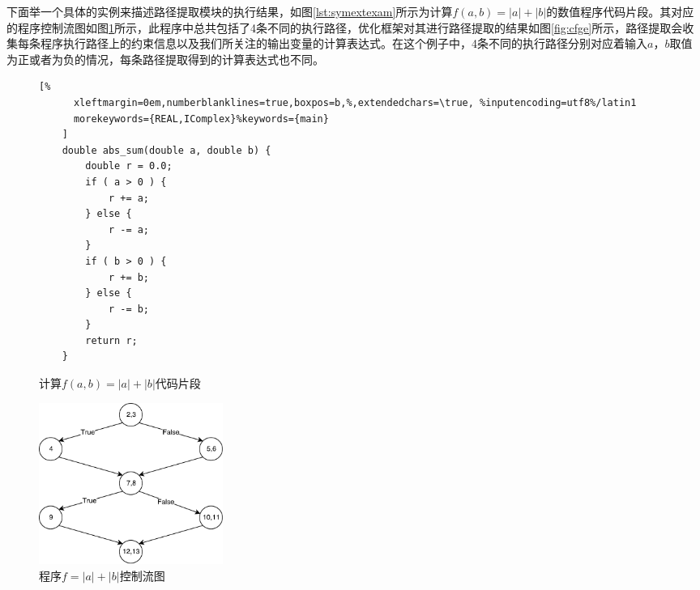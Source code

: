 下面举一个具体的实例来描述路径提取模块的执行结果，如图\ref{lst:symextexam}所示为计算$f(a,b)=|a|+|b|$的数值程序代码片段。其对应的程序控制流图如图\ref{fig:cfg}所示，此程序中总共包括了4条不同的执行路径，优化框架对其进行路径提取的结果如图\ref{fig:cfge}所示，路径提取会收集每条程序执行路径上的约束信息以及我们所关注的输出变量的计算表达式。在这个例子中，4条不同的执行路径分别对应着输入$a$，$b$取值为正或者为负的情况，每条路径提取得到的计算表达式也不同。

\begin{figure}[htbp]
  \centering
  \begin{minipage}[b]{0.58\textwidth}
  \centering
  \begin{lstlisting}[%
      xleftmargin=0em,numberblanklines=true,boxpos=b,%,extendedchars=\true, %inputencoding=utf8%/latin1
      morekeywords={REAL,IComplex}%keywords={main}
    ]
    double abs_sum(double a, double b) {
        double r = 0.0;
        if ( a > 0 ) { 
            r += a; 
        } else { 
            r -= a;
        }
        if ( b > 0 ) {
            r += b;
        } else {
            r -= b;
        }
        return r;
    }
  \end{lstlisting}
  \caption{计算$f(a,b)=|a|+|b|$代码片段}
  \label{lst:symextexam}
  \end{minipage}
  \begin{minipage}[b]{0.38\textwidth}
  \centering
  \includegraphics[width=6cm]{fig/ControlFlowGraph.pdf}
  \caption{程序$f=|a|+|b|$控制流图} \label{fig:cfg}
  \end{minipage}
\end{figure}
  

